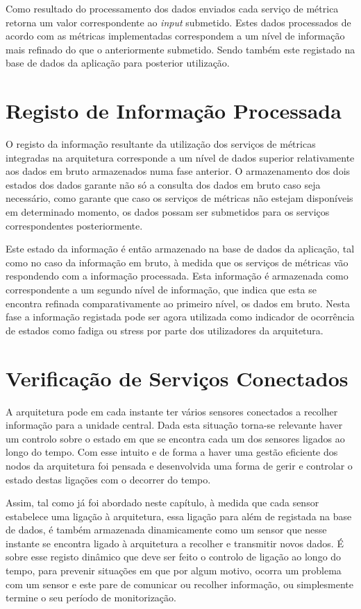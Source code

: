 Como resultado do processamento dos dados enviados cada serviço de métrica retorna um valor correspondente ao \textit{input} submetido. Estes dados processados de acordo com as métricas implementadas correspondem a um nível de informação mais refinado do que o anteriormente submetido. Sendo também este registado na base de dados da aplicação para posterior utilização.

\section{Registo de Informação Processada}

O registo da informação resultante da utilização dos serviços de métricas integradas na arquitetura corresponde a um nível de dados superior relativamente aos dados em bruto armazenados numa fase anterior. O armazenamento dos dois estados dos dados garante não só a consulta dos dados em bruto caso seja necessário, como garante que caso os serviços de métricas não estejam disponíveis em determinado momento, os dados possam ser submetidos para os serviços correspondentes posteriormente.

Este estado da informação é então armazenado na base de dados da aplicação, tal como no caso da informação em bruto, à medida que os serviços de métricas vão respondendo com a informação processada. Esta informação é armazenada como correspondente a um segundo nível de informação, que indica que esta se encontra refinada comparativamente ao primeiro nível, os dados em bruto. Nesta fase a informação registada pode ser agora utilizada como indicador de ocorrência de estados como fadiga ou stress por parte dos utilizadores da arquitetura.

\section{Verificação de Serviços Conectados}

A arquitetura pode em cada instante ter vários sensores conectados a recolher informação para a unidade central. Dada esta situação torna-se relevante haver um controlo sobre o estado em que se encontra cada um dos sensores ligados ao longo do tempo. Com esse intuito e de forma a haver uma gestão eficiente dos nodos da arquitetura foi pensada e desenvolvida uma forma de gerir e controlar o estado destas ligações com o decorrer do tempo.

Assim, tal como já foi abordado neste capítulo, à medida que cada sensor estabelece uma ligação à arquitetura, essa ligação para além de registada na base de dados, é também armazenada dinamicamente como um sensor que nesse instante se encontra ligado à arquitetura a recolher e transmitir novos dados. É sobre esse registo dinâmico que deve ser feito o controlo de ligação ao longo do tempo, para prevenir situações em que por algum motivo, ocorra um problema com um sensor e este pare de comunicar ou recolher informação, ou simplesmente termine o seu período de monitorização.

